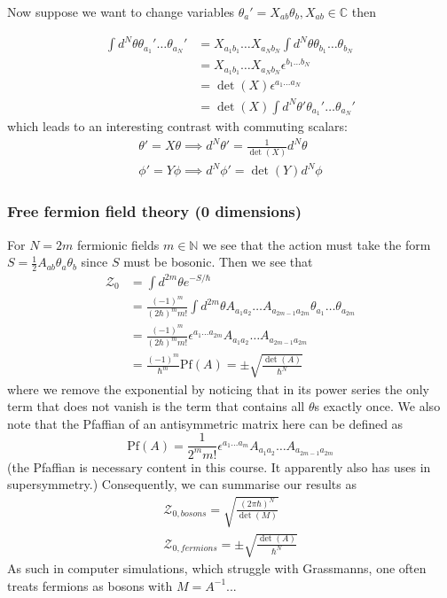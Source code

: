 \documentclass{article}
\theoremstyle{definition}
\begin{document}
Now suppose we want to change variables $\theta_a' = X_{ab}\theta_b, X_{ab} \in
\mathbb{C}$ then

\begin{align*}
  \int d^N \theta \theta_{a_1}' \dots \theta_{a_N}'
  &= X_{a_1b_1} \dots X_{a_Nb_N} \int d^N \theta \theta_{b_1} \dots \theta_{b_N} \\
  &= X_{a_1b_1} \dots X_{a_Nb_N} \epsilon^{b_1 \dots b_N} \\
  &= \det (X) \epsilon^{a_1 \dots a_N} \\
  &= \det (X) \int d^N\theta' \theta_{a_1}' \dots \theta_{a_N}'
\end{align*}
which leads to an interesting contrast with commuting scalars:
\begin{align}
  \theta' = X\theta \implies d^N \theta' = \frac{1}{\det(X)} d^N \theta \\
  \phi' = Y \phi \implies d^N \phi' = \det(Y) d^N\phi
\end{align}

\subsubsection{Free fermion field theory (0 dimensions)}

For $N = 2m$ fermionic fields $m \in \mathbb{N}$ we see that the action must
take the form $S = \frac{1}{2} A_{ab} \theta_a \theta_b$ since $S$ must be
bosonic. Then we see that
\begin{align*}
  \mathcal{Z}_0
  &= \int d^{2m} \theta e^{-S / \hbar} \\
  &= \frac{(-1)^m}{(2\hbar)^m m!} \int d^{2m}\theta A_{a_1a_2} \dots
    A_{a_{2m - 1}a_{2m}} \theta_{a_1} \dots \theta_{a_{2m}} \\
  &= \frac{(-1)^m}{(2\hbar)^m m!} \epsilon^{a_1 \dots a_{2m}}
    A_{a_1a_2} \dots A_{a_{2m - 1}a_{2m}} \\
  &= \frac{(-1)^m}{\hbar^m} \text{Pf}(A) = \pm \sqrt{\frac{\det(A)}{\hbar^N}}
\end{align*}
where we remove the exponential by noticing that in its power series the only
term that does not vanish is the term that contains all $\theta$s exactly once.
We also note that the Pfaffian of an antisymmetric matrix here can be defined as
\begin{equation}
  \text{Pf}(A) = \frac{1}{2^m m!} \epsilon^{a_1 \dots a_{m}}
  A_{a_1a_2} \dots A_{a_{2m - 1}a_{2m}}
\end{equation}
(the Pfaffian is necessary content in this course. It apparently also has uses
in supersymmetry.) Consequently, we can summarise our results as
\begin{align}
  \mathcal{Z}_{0, bosons} = \sqrt{\frac{(2\pi \hbar)^N}{\det(M)}} \\
  \mathcal{Z}_{0, fermions} = \pm \sqrt{\frac{\det(A)}{\hbar^N}}
\end{align}
As such in computer simulations, which struggle with Grassmanns, one often
treats fermions as bosons with $M = A^{-1}$...
\end{document}
